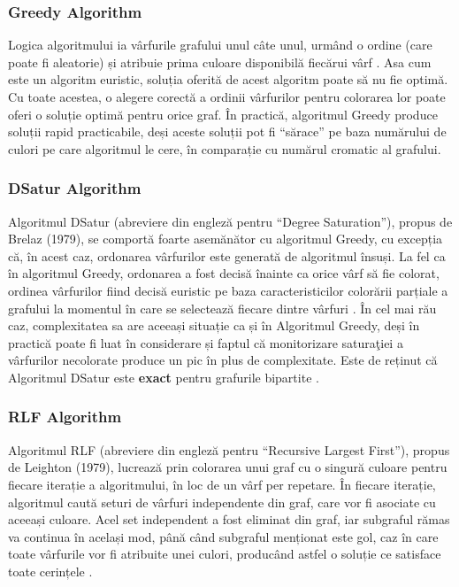 \documentclass[runningheads]{llncs}
\begin{document}
\subsubsection{Greedy Algorithm}
Logica algoritmului ia vârfurile grafului unul câte unul, urmând o ordine 
(care poate fi aleatorie) și atribuie prima culoare disponibilă fiecărui vârf \cite{11}. 
Asa cum este un algoritm euristic, soluția oferită de acest algoritm poate să nu fie optimă.
Cu toate acestea, o alegere corectă a ordinii vârfurilor pentru
colorarea lor poate oferi o soluție optimă pentru orice graf. În
practică, algoritmul Greedy produce soluții rapid practicabile, deși aceste soluții 
pot fi “sărace” pe baza numărului de culori pe care algoritmul le cere, în comparație cu
numărul cromatic al grafului.

\subsubsection{DSatur Algorithm}
Algoritmul DSatur (abreviere din engleză pentru “Degree Saturation”), 
propus de Brelaz (1979), se comportă foarte asemănător cu
algoritmul Greedy, cu excepția că, în acest caz,
ordonarea vârfurilor este generată de algoritmul însuși.
La fel ca în algoritmul Greedy, ordonarea a fost decisă
înainte ca orice vârf să fie colorat, ordinea vârfurilor fiind decisă euristic pe baza
caracteristicilor colorării parțiale a grafului la
momentul în care se selectează fiecare dintre vârfuri \cite{12}. 
În cel mai rău caz, complexitatea sa are aceeași situație ca și în
Algoritmul Greedy, deși în practică poate fi luat în considerare
și faptul că monitorizare saturaţiei a vârfurilor necolorate
produce un pic în plus de complexitate. Este de reținut că
Algoritmul DSatur este \textbf{exact} pentru grafurile bipartite \cite{13}.

\subsubsection{RLF Algorithm}
Algoritmul RLF (abreviere din engleză pentru “Recursive Largest First”), propus
de Leighton (1979), lucrează prin colorarea unui graf cu o singură culoare
pentru fiecare iterație a algoritmului, în loc de un vârf per
repetare. În fiecare iterație, algoritmul caută seturi de
vârfuri independente din graf, care vor fi asociate
cu aceeași culoare. Acel set independent a fost eliminat
din graf, iar subgraful rămas va continua
în același mod, până când subgraful menționat este gol, caz în care
toate vârfurile vor fi atribuite unei culori, producând astfel o
soluție ce satisface toate cerințele \cite{11}.
\end{document}
